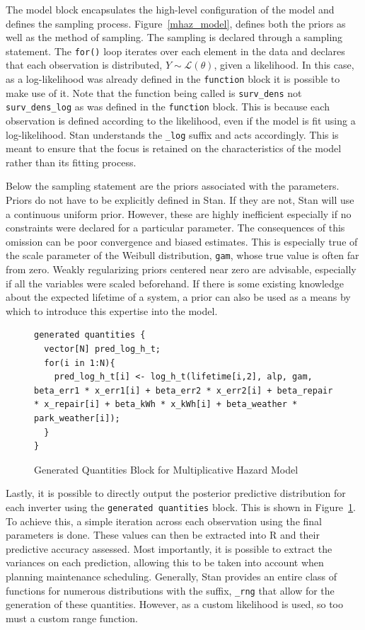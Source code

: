 The model block encapsulates the high-level configuration of the model and defines the sampling process. Figure~\ref{mhaz_model}, defines both the priors as well as the method of sampling. The sampling is declared through a sampling statement. The \lstinline{for()} loop iterates over each element in the data and declares that each observation is distributed, $Y \sim \mathcal {L}(\theta)$,  given a likelihood. In this case, as a log-likelihood was already defined in the \lstinline{function} block it is possible to make use of it. Note that the function being called is \lstinline{surv_dens} not \lstinline{surv_dens_log} as was defined in the \lstinline{function} block. This is because each observation is defined according to the likelihood, even if the model is fit using a log-likelihood. Stan understands the \lstinline{_log} suffix and acts accordingly. This is meant to ensure that the focus is retained on the characteristics of the model rather than its fitting process. 

Below the sampling statement are the priors associated with the parameters. Priors do not have to be explicitly defined in Stan. If they are not, Stan will use a continuous uniform prior. However, these are highly inefficient especially if no constraints were declared for a particular parameter. The consequences of this omission can be poor convergence and biased estimates. This is especially true of the scale parameter of the Weibull distribution, \lstinline{gam}, whose true value is often far from zero. Weakly regularizing priors centered near zero are advisable, especially if all the variables were scaled beforehand. If there is some existing knowledge about the expected lifetime of a system, a prior can also be used as a means by which to introduce this expertise into the model. 



\begin{figure}[htbp]
    \centering
    \begin{lstlisting}[belowskip=-2 \baselineskip]
generated quantities {
  vector[N] pred_log_h_t;
  for(i in 1:N){
    pred_log_h_t[i] <- log_h_t(lifetime[i,2], alp, gam, beta_err1 * x_err1[i] + beta_err2 * x_err2[i] + beta_repair * x_repair[i] + beta_kWh * x_kWh[i] + beta_weather * park_weather[i]);
  }
}
    \end{lstlisting}
    \caption{Generated Quantities Block for Multiplicative Hazard Model}
    \label{mhaz_quants}
\end{figure}

Lastly, it is possible to directly output the posterior predictive distribution for each inverter using the \lstinline{generated quantities} block. This is shown in Figure~\ref{mhaz_quants}. To achieve this, a simple iteration across each observation using the final parameters is done. These values can then be extracted into R and their predictive accuracy assessed. Most importantly, it is possible to extract the variances on each prediction, allowing this to be taken into account when planning maintenance scheduling. Generally, Stan provides an entire class of functions for numerous distributions with the suffix, \lstinline{_rng} that allow for the generation of these quantities. However, as a custom likelihood is used, so too must a custom range function.

